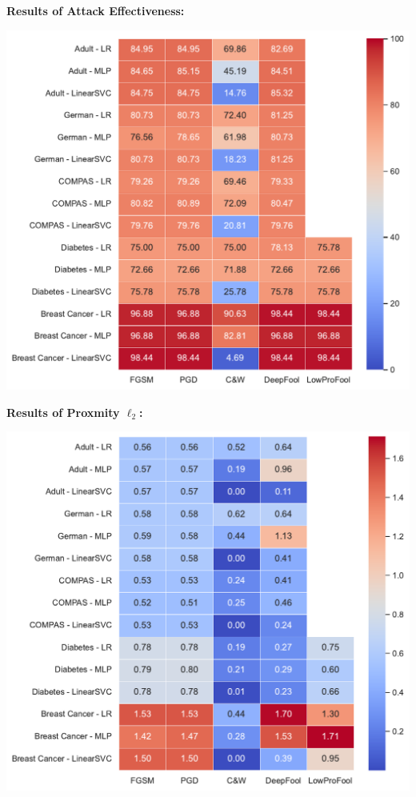 \documentclass[portrait,a0paper,margin=17mm,fontscale=0.292]{baposter}
\begin{document}
\begin{poster}
{        \textbf{\color{blue}Results of Attack Effectiveness:}
        \begin{center}
            \vspace{-0.8em}
            \includegraphics[width=\textwidth]{images/asr_rgb.pdf}
        \end{center}
        \vspace{-0.4em}
        \textbf{\color{blue}Results of Proxmity $\ell_2$:}
        \begin{center}
            \vspace{-0.7em}
            \includegraphics[width=\textwidth]{images/l2_rgb.pdf}
        \end{center}

}
\end{poster}
\end{document}
